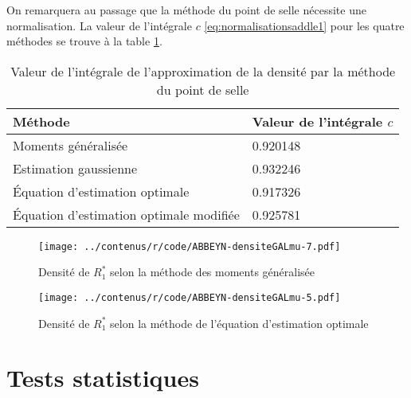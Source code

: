 On remarquera au passage que la méthode du point de selle nécessite
une normalisation. La valeur de l'intégrale $c$
\eqref{eq:normalisationsaddle1} pour les quatre méthodes se trouve à
la table \ref{tab:intapproxpointselleR1}.
\begin{table}[!ht]
  \centering
  \begin{tabular}{ll}
    \hline
    \textbf{Méthode} & \textbf{Valeur de l'intégrale $c$}\\
    \hline
    Moments généralisée & 0.920148 \\
    Estimation gaussienne & 0.932246 \\
    Équation d'estimation optimale & 0.917326 \\
    Équation d'estimation optimale modifiée & 0.925781 \\
    \hline
  \end{tabular}
  \caption{Valeur de l'intégrale de l'approximation de la densité par la méthode du point de selle }
  \label{tab:intapproxpointselleR1}
\end{table}

\begin{figure}[!ht]
  \centering
  \texttt{[image: ../contenus/r/code/ABBEYN-densiteGALmu-7.pdf]}
  \caption{Densité de $R_1^{*}$ selon la méthode des moments
    généralisée}
  \label{fig:densite1R1}
\end{figure}

\begin{figure}[!ht]
  \centering
  \texttt{[image: ../contenus/r/code/ABBEYN-densiteGALmu-5.pdf]}
  \caption{Densité de $R_1^{*}$ selon la méthode de l'équation
    d'estimation optimale}
  \label{fig:densite3R1}
\end{figure}

\clearpage
\section{Tests statistiques}
\label{sec:tests-statistiques}

